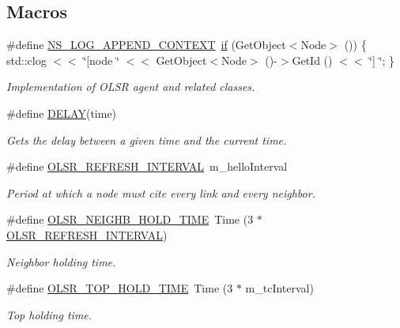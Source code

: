\subsection*{Macros}
\begin{DoxyCompactItemize}
\item 
\#define \hyperlink{olsr-routing-protocol_8cc_abe50035652d407c40bdaef78214c4955}{N\+S\+\_\+\+L\+O\+G\+\_\+\+A\+P\+P\+E\+N\+D\+\_\+\+C\+O\+N\+T\+E\+XT}~\hyperlink{loss__OH__large__cities__urban_8m_ac77b6cfa3068152087725fe54b4ae8c8}{if} (Get\+Object$<$Node$>$ ()) \{ std\+::clog $<$$<$ \char`\"{}\mbox{[}node \char`\"{} $<$$<$ Get\+Object$<$Node$>$ ()-\/$>$Get\+Id () $<$$<$ \char`\"{}\mbox{]} \char`\"{}; \}
\begin{DoxyCompactList}\small\item\em Implementation of O\+L\+SR agent and related classes. \end{DoxyCompactList}\item 
\#define \hyperlink{olsr-routing-protocol_8cc_ad0a00c3386c4a24278b3b710ae798220}{D\+E\+L\+AY}(time)
\begin{DoxyCompactList}\small\item\em Gets the delay between a given time and the current time. \end{DoxyCompactList}\item 
\#define \hyperlink{olsr-routing-protocol_8cc_abd4f5d49ab0d9070519757a8f5e8b86d}{O\+L\+S\+R\+\_\+\+R\+E\+F\+R\+E\+S\+H\+\_\+\+I\+N\+T\+E\+R\+V\+AL}~m\+\_\+hello\+Interval
\begin{DoxyCompactList}\small\item\em Period at which a node must cite every link and every neighbor. \end{DoxyCompactList}\item 
\#define \hyperlink{olsr-routing-protocol_8cc_a32428f0b560f93c0a160b27181704faa}{O\+L\+S\+R\+\_\+\+N\+E\+I\+G\+H\+B\+\_\+\+H\+O\+L\+D\+\_\+\+T\+I\+ME}~Time (3 $\ast$ \hyperlink{olsr-routing-protocol_8cc_abd4f5d49ab0d9070519757a8f5e8b86d}{O\+L\+S\+R\+\_\+\+R\+E\+F\+R\+E\+S\+H\+\_\+\+I\+N\+T\+E\+R\+V\+AL})
\begin{DoxyCompactList}\small\item\em Neighbor holding time. \end{DoxyCompactList}\item 
\#define \hyperlink{olsr-routing-protocol_8cc_a52dd6b4ef360db0602f9cfbc820e3402}{O\+L\+S\+R\+\_\+\+T\+O\+P\+\_\+\+H\+O\+L\+D\+\_\+\+T\+I\+ME}~Time (3 $\ast$ m\+\_\+tc\+Interval)
\begin{DoxyCompactList}\small\item\em Top holding time. \end{DoxyCompactList}\item 
$$
\end{DoxyCompactItemize}
